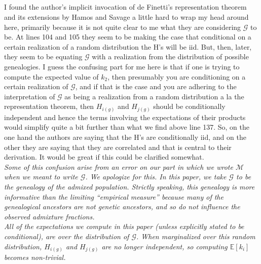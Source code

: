 \documentclass[11pt]{amsart}
\begin{document}
\subsection{} I found the author's implicit invocation of de Finetti's representation theorem and its extensions by Hamos and Savage a little hard to wrap my head around here, primarily because it is not quite clear to me what they are considering $\mathcal{G}$ to be.
At lines 104 and 105 they seem to be making the case that conditional on a certain realization of a random distribution the H's will be iid.
But, then, later, they seem to be equating $\mathcal{G}$ with a realization from the distribution of possible genealogies.
I guess the confusing part for me here is that if one is trying to compute the expected value of $k_2$, then presumably you are conditioning on a certain realization of $\mathcal{G}$,
and if that is the case and you are adhering to
the interpretation of $\mathcal{G}$ as being a realization from a random distribution a la the representation theorem,
then $H_{i(g)}$ and $H_{j(g)}$ should be conditionally independent and hence the terms involving the
expectations of their products would simplify quite a bit further than what we find above line 137.
So, on the one hand the authors are saying that the H's are conditionally iid, and on the other they are saying that they are correlated and that is central to their derivation.
It would be great if this could be clarified somewhat.\\
\textit{
	\indent
	Some of this confusion arise from an error on our part in which we wrote $\mathcal{M}$ when we meant to write $\mathcal{G}$.
	We apologize for this.
	In this paper, we take $\mathcal{G}$ to be the genealogy of the admixed population.
	Strictly speaking, this genealogy is more informative than the limiting ``empirical measure'' because many of the genealogical ancestors are not genetic ancestors, and so do not influence the observed admixture fractions. \\
	\indent
	All of the expectations we compute in this paper (unless explicitly stated to be conditional), are over the distribution of $\mathcal{G}$. When marginalized over this random distribution, $H_{i(g)}$ and $H_{j(g)}$ are no longer independent, so computing $\mathbb{E}[k_i]$ becomes non-trivial.
}
\end{document}
